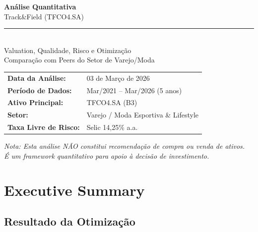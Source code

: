 \documentclass[12pt, a4paper]{article}
\begin{document}
\begin{titlepage}
\centering
\vspace*{3cm}

{\Huge\bfseries\color{azulescuro} Análise Quantitativa}\\[0.5cm]
{\LARGE\color{azulescuro} Track\&Field (TFCO4.SA)}\\[1cm]

\rule{\textwidth}{1pt}\\[0.5cm]

{\large Valuation, Qualidade, Risco e Otimização}\\[0.3cm]
{\large Comparação com Peers do Setor de Varejo/Moda}\\[2cm]

\begin{tabular}{ll}
\textbf{Data da Análise:} & 03 de Março de 2026 \\
\textbf{Período de Dados:} & Mar/2021 -- Mar/2026 (5 anos) \\
\textbf{Ativo Principal:} & TFCO4.SA (B3) \\
\textbf{Setor:} & Varejo / Moda Esportiva \& Lifestyle \\
\textbf{Taxa Livre de Risco:} & Selic 14,25\% a.a. \\
\end{tabular}

\vfill

{\small\textit{Nota: Esta análise NÃO constitui recomendação de compra ou venda de ativos.\\
É um framework quantitativo para apoio à decisão de investimento.}}

\end{titlepage}

\tableofcontents
\newpage

\section{Executive Summary}

\subsection{Resultado da Otimização}
\end{document}
